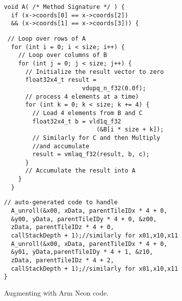 \begin{figure}[h]
\begin{verbatim}
void A( /* Method Signature */ ) {
  if (x->coords[0] == x->coords[2]) 
  && (x->coords[1] == x->coords[3])) {  
  \end{verbatim}
  \vspace{-3mm}
\begin{tcolorbox}[colback=white, boxrule=0.5pt, sharp corners, title= Optimized terminating case with NEON. ]
\begin{verbatim}
 // Loop over rows of A
  for (int i = 0; i < size; i++) {
    // Loop over columns of B
    for (int j = 0; j < size; j++) {
      // Initialize the result vector to zero
      float32x4_t result = 
                      vdupq_n_f32(0.0f);
      // process 4 elements at a time)
      for (int k = 0; k < size; k += 4) {
        // Load 4 elements from B and C
        float32x4_t b = vld1q_f32
                          (&B[i * size + k]);
        // Similarly for C and then Multiply
        //and accumulate
        result = vmlaq_f32(result, b, c);
      }
      // Accumulate the result into A
    }
  }
\end{verbatim}
\end{tcolorbox}
\begin{verbatim}
// auto-generated code to handle
  A_unroll(&x00, xData, parentTileIDx * 4 + 0,
  &y00, yData, parentTileIDy * 4 + 0, &z00, 
  zData, parentTileIDz * 4 + 0,
  callStackDepth + 1);//similarly for x01,x10,x11
  A_unroll(&x00, xData, parentTileIDx * 4 + 0,
  &y01, yData,parentTileIDy * 4 + 1, &z10,
  zData, parentTileIDz * 4 + 2,
  callStackDepth + 1);//similarly for x01,x10,x11
}
\end{verbatim}
\caption{Augmenting with Arm Neon code.}
    \label{fig:d2p_NEON}
\end{figure}

